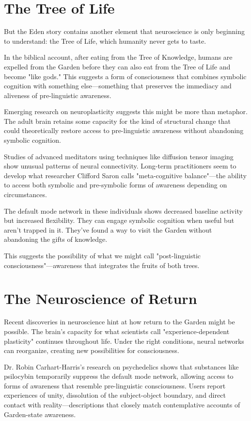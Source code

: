 \documentclass[10pt,twocolumn]{article}
\begin{document}
\section{The Tree of Life}

But the Eden story contains another element that neuroscience is only beginning to understand: the Tree of Life, which humanity never gets to taste.

In the biblical account, after eating from the Tree of Knowledge, humans are expelled from the Garden before they can also eat from the Tree of Life and become "like gods." This suggests a form of consciousness that combines symbolic cognition with something else—something that preserves the immediacy and aliveness of pre-linguistic awareness.

Emerging research on neuroplasticity suggests this might be more than metaphor. The adult brain retains some capacity for the kind of structural change that could theoretically restore access to pre-linguistic awareness without abandoning symbolic cognition.

Studies of advanced meditators using techniques like diffusion tensor imaging show unusual patterns of neural connectivity. Long-term practitioners seem to develop what researcher Clifford Saron calls "meta-cognitive balance"—the ability to access both symbolic and pre-symbolic forms of awareness depending on circumstances.

The default mode network in these individuals shows decreased baseline activity but increased flexibility. They can engage symbolic cognition when useful but aren't trapped in it. They've found a way to visit the Garden without abandoning the gifts of knowledge.

This suggests the possibility of what we might call "post-linguistic consciousness"—awareness that integrates the fruits of both trees.

\section{The Neuroscience of Return}

Recent discoveries in neuroscience hint at how return to the Garden might be possible. The brain's capacity for what scientists call "experience-dependent plasticity" continues throughout life. Under the right conditions, neural networks can reorganize, creating new possibilities for consciousness.

Dr. Robin Carhart-Harris's research on psychedelics shows that substances like psilocybin temporarily suppress the default mode network, allowing access to forms of awareness that resemble pre-linguistic consciousness. Users report experiences of unity, dissolution of the subject-object boundary, and direct contact with reality—descriptions that closely match contemplative accounts of Garden-state awareness.
\end{document}
